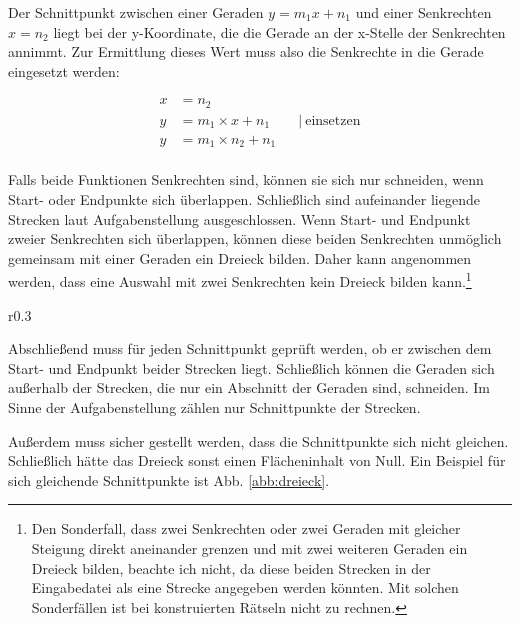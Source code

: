 Der Schnittpunkt zwischen einer Geraden \(y=m_1x+n_1\) und einer Senkrechten \(x=n_2\)
liegt bei der y-Koordinate, die die Gerade an der x-Stelle der Senkrechten annimmt.
Zur Ermittlung dieses Wert muss also die Senkrechte in die Gerade eingesetzt werden:

\begin{equation}
    \begin{aligned}
        x &= n_2                    \\
        y &= m_1 \times x + n_1 \qquad\vert\ \text{einsetzen}  \\
        y &= m_1 \times n_2 + n_1   \\
    \end{aligned}
    \label{eq:senkrechtschnitt}
\end{equation}

Falls beide Funktionen Senkrechten sind, können sie sich nur schneiden,
wenn Start- oder Endpunkte sich überlappen.
Schließlich sind aufeinander liegende Strecken laut Aufgabenstellung ausgeschlossen.
Wenn Start- und Endpunkt zweier Senkrechten sich überlappen,
können diese beiden Senkrechten unmöglich gemeinsam mit einer Geraden
ein Dreieck bilden. Daher kann angenommen werden, dass eine Auswahl mit zwei Senkrechten
kein Dreieck bilden kann.\footnote{Den Sonderfall, dass zwei Senkrechten oder zwei Geraden
mit gleicher Steigung direkt aneinander grenzen und mit zwei weiteren Geraden ein Dreieck
bilden, beachte ich nicht, da diese beiden Strecken in der Eingabedatei als eine Strecke
angegeben werden könnten. Mit solchen Sonderfällen ist bei konstruierten Rätseln nicht
zu rechnen.}

\begin{wrapfigure}{r}{0.3\textwidth}
    \begin{center}
    
    \end{center}
    \caption{Dreieck mit der Flächengröße 0}
    \label{abb:dreieck}
\end{wrapfigure}
Abschließend muss für jeden Schnittpunkt geprüft werden,
ob er zwischen dem Start- und Endpunkt beider Strecken liegt.
Schließlich können die Geraden sich außerhalb der Strecken,
die nur ein Abschnitt der Geraden sind, schneiden.
Im Sinne der Aufgabenstellung zählen nur Schnittpunkte der Strecken.

Außerdem muss sicher gestellt werden, dass die Schnittpunkte sich nicht gleichen.
Schließlich hätte das Dreieck sonst einen Flächeninhalt von Null.
Ein Beispiel für sich gleichende Schnittpunkte ist Abb. \ref{abb:dreieck}.

